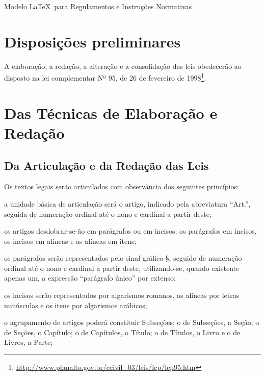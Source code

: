 \documentclass[11pt,twoside,a4paper]{inifsc}
\begin{document}
\begin{normativa}{Modelo \LaTeX~para Regulamentos e Instruções Normativas}

\chapter{Disposições preliminares}

\begin{artigo}
    \item A elaboração, a redação, a alteração e a consolidação das leis obedecerão ao disposto na lei complementar Nº 95, de 26 de fevereiro de 1998\footnote{\url{http://www.planalto.gov.br/ccivil_03/leis/lcp/lcp95.htm}}.

\end{artigo}



\chapter{Das Técnicas de Elaboração e Redação}


\section{Da Articulação e da Redação das Leis}


\begin{artigo}
    \item\label{art:observancia}
    Os textos legais serão articulados com observância dos seguintes princípios:
    \begin{inciso}
        \item\label{inc:formatoartigo}
         a unidade básica de articulação será o artigo, indicado pela abreviatura ``Art.'', seguida de numeração ordinal até o nono e cardinal a partir deste;
        \item os artigos desdobrar-se-ão em parágrafos ou em incisos; os parágrafos em incisos, os incisos em alíneas e as alíneas em itens;
        \item os parágrafos serão representados pelo sinal gráfico §, seguido de numeração ordinal até o nono e cardinal a partir deste, utilizando-se, quando existente apenas um, a expressão ``parágrafo único'' por extenso;
        \item os incisos serão representados por algarismos romanos, as alíneas por letras minúsculas e os itens por algarismos arábicos;
        \item o agrupamento de artigos poderá constituir Subseções; o de Subseções, a Seção; o de Seções, o Capítulo; o de Capítulos, o Título; o de Títulos, o Livro e o de Livros, a Parte;
    \end{inciso}


\end{artigo}
\end{normativa}
\end{document}
